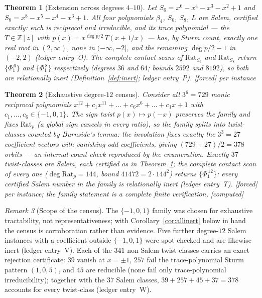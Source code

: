 \documentclass[11pt]{article}
\theoremstyle{plain}
\newtheorem{theorem}{Theorem}[section]
\theoremstyle{definition}
\theoremstyle{remark}
\newtheorem{remark}[theorem]{Remark}
\newcommand{\Z}{\mathbb{Z}}
\newcommand{\Rat}{\mathrm{Rat}}
\newcommand{\F}{\textnormal{[forced]}}
\newcommand{\C}{\textnormal{[computed]}}
\begin{document}
\begin{theorem}[Extension across degrees $4$--$10$]\label{thm:inertmore}
Let $S_6=x^6-x^4-x^3-x^2+1$ and $S_8=x^8-x^5-x^4-x^3+1$. All four polynomials
$\beta_4$, $S_6$, $S_8$, $L$ are Salem, certified exactly: each is reciprocal
and irreducible, and its trace polynomial --- the $T\in\Z[z]$ with
$p(x)=x^{\deg p/2}\,T(x+1/x)$ --- has, by Sturm count, exactly one real root
in $(2,\infty)$, none in $(-\infty,-2]$, and the remaining $\deg p/2-1$ in
$(-2,2)$ (ledger entry~O). The complete contact scans of $\Rat_{S_6}$ and
$\Rat_{S_8}$ return $\{\Phi_1^{\,6}\}$ and $\{\Phi_1^{\,8}\}$ respectively
(degrees $36$ and $64$; bounds $2592$ and $8192$), so both are relationally
inert (Definition~\ref{def:inert}; ledger entry~P). \F{} per instance
\end{theorem}

\begin{theorem}[Exhaustive degree-$12$ census]\label{thm:census}
Consider all $3^6=729$ monic reciprocal polynomials
$x^{12}+c_1x^{11}+\dots+c_6x^6+\dots+c_1x+1$ with
$c_1,\dots,c_6\in\{-1,0,1\}$. The sign twist $p(x)\mapsto p(-x)$ preserves
the family and fixes $\Rat_p$ (a global sign cancels in every ratio), so the
family splits into twist-classes counted by Burnside's lemma: the involution
fixes exactly the $3^3=27$ coefficient vectors with vanishing odd
coefficients, giving $(729+27)/2=378$ orbits --- an internal count check
reproduced by the enumeration. Exactly $37$ twist-classes are
Salem, each certified as in Theorem~\ref{thm:inertmore}; the complete
contact scan of every one ($\deg\Rat_p=144$, bound $41472=2\cdot144^2$)
returns $\{\Phi_1^{\,12}\}$: \emph{every certified Salem number in the
family is relationally inert} (ledger entry~T). \F{} per instance; the
family statement is a complete finite verification, \C
\end{theorem}

\begin{remark}[Scope of the census]\label{rem:censusscope}
The $\{-1,0,1\}$ family was chosen for exhaustive tractability, not
representativeness; with Corollary~\ref{cor:allinert} below in hand the
census is corroboration rather than evidence. Five further degree-$12$
Salem instances with a coefficient outside $\{-1,0,1\}$ were spot-checked
and are likewise inert (ledger entry~V). Each of the $341$ non-Salem
twist-classes carries an exact rejection certificate: $39$ vanish at
$x=\pm1$, $257$ fail the trace-polynomial Sturm pattern $(1,0,5)$, and $45$
are reducible (none fail only trace-polynomial irreducibility); together
with the $37$ Salem classes, $39+257+45+37=378$ accounts for every
twist-class (ledger entry~W).
\end{remark}
\end{document}

